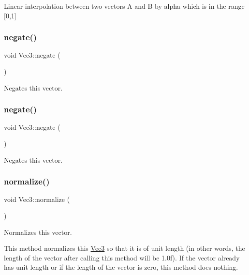 Linear interpolation between two vectors A and B by alpha which is in the range \mbox{[}0,1\mbox{]} \mbox{\label{classVec3_aa770b4935cd7d13e1f2571b326e98ac9}} 
\subsubsection{\texorpdfstring{negate()}{negate()}\hspace{0.1cm}{\footnotesize\ttfamily [1/2]}}
{\footnotesize\ttfamily void Vec3\+::negate (\begin{DoxyParamCaption}{ }\end{DoxyParamCaption})\hspace{0.3cm}{\ttfamily [inline]}}

Negates this vector. \mbox{\label{classVec3_aa770b4935cd7d13e1f2571b326e98ac9}} 
\subsubsection{\texorpdfstring{negate()}{negate()}\hspace{0.1cm}{\footnotesize\ttfamily [2/2]}}
{\footnotesize\ttfamily void Vec3\+::negate (\begin{DoxyParamCaption}{ }\end{DoxyParamCaption})\hspace{0.3cm}{\ttfamily [inline]}}

Negates this vector. \mbox{\label{classVec3_a3a6631559d1d36eaf34ca586ce86ede1}} 
\subsubsection{\texorpdfstring{normalize()}{normalize()}\hspace{0.1cm}{\footnotesize\ttfamily [1/2]}}
{\footnotesize\ttfamily void Vec3\+::normalize (\begin{DoxyParamCaption}{ }\end{DoxyParamCaption})}

Normalizes this vector.

This method normalizes this \hyperlink{classVec3}{Vec3} so that it is of unit length (in other words, the length of the vector after calling this method will be 1.\+0f). If the vector already has unit length or if the length of the vector is zero, this method does nothing.

